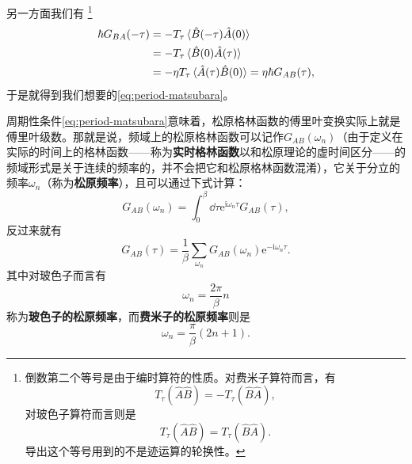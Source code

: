 \documentclass[hyperref, UTF8, a4paper]{ctexart}
\newcommand*{\ii}{\mathrm{i}}
\newcommand*{\ee}{\mathrm{e}}
\begin{document}
另一方面我们有%
\footnote{倒数第二个等号是由于编时算符的性质。对费米子算符而言，有
\[
    T_\tau (\hat{A} \hat{B}) = - T_\tau (\hat{B} \hat{A}),
\]
对玻色子算符而言则是
\[
    T_\tau (\hat{A} \hat{B}) = T_\tau (\hat{B} \hat{A}).
\]
导出这个等号用到的不是迹运算的轮换性。
}
\[
    \begin{aligned}
        \hbar G_{BA}(-\tau) &= - T_\tau  \expval*{\hat{B}(-\tau)\hat{A}(0)} \\
        &= - T_\tau \expval*{\hat{B}(0)\hat{A}(\tau)} \\
        &= - \eta T_\tau \expval*{\hat{A}(\tau)\hat{B}(0)} = \eta \hbar G_{AB}(\tau),
    \end{aligned}
\]
于是就得到我们想要的\eqref{eq:period-matsubara}。

周期性条件\eqref{eq:period-matsubara}意味着，松原格林函数的傅里叶变换实际上就是傅里叶级数。那就是说，频域上的松原格林函数可以记作$G_{AB}(\omega_n)$（由于定义在实际的时间上的格林函数——称为\textbf{实时格林函数}以和松原理论的虚时间区分——的频域形式是关于连续的频率的，并不会把它和松原格林函数混淆），它关于分立的频率$\omega_n$（称为\textbf{松原频率}），且可以通过下式计算：
\begin{equation}
    G_{AB}(\omega_n) = \int_0^\beta \dd{\tau} \ee^{\ii \omega_n \tau} G_{AB}(\tau),
\end{equation}
反过来就有
\begin{equation}
    G_{AB}(\tau) = \frac{1}{\beta} \sum_{\omega_n} G_{AB}(\omega_n) \ee^{- \ii \omega_n \tau}.
\end{equation}
其中对玻色子而言有
\begin{equation}
    \omega_n = \frac{2\pi}{\beta} n
\end{equation}
称为\textbf{玻色子的松原频率}，而\textbf{费米子的松原频率}则是
\begin{equation}
    \omega_n = \frac{\pi}{\beta} (2n+1).
\end{equation}
\end{document}

